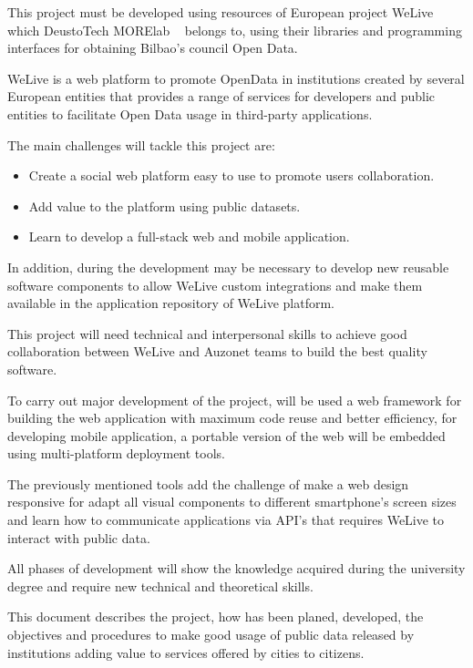 \documentclass{DeustoFDP}
\begin{document}
This project must be developed using resources of European project WeLive ~\cite{WeLive} which DeustoTech \cite{DeustoTech} MORElab ~\cite{Morelab} belongs to, using their libraries and programming interfaces for obtaining Bilbao's council Open Data. 

WeLive is a web platform to promote OpenData in institutions created by several European entities \cite{WeLiveConsortium} that provides a range of services for developers and public entities to facilitate Open Data usage in third-party applications.

The main challenges will tackle this project are:

\begin{itemize}
    \item Create a social web platform easy to use to promote users collaboration.
    \item Add value to the platform using public datasets.
    \item Learn to develop a full-stack web and mobile application.
\end{itemize}

In addition, during the development may be necessary to develop new reusable software components to allow WeLive custom integrations and make them available in the application repository of WeLive platform.

This project will need technical and interpersonal skills to achieve good collaboration between WeLive and Auzonet teams to build the best quality software.

To carry out major development of the project, will be used a web framework for building the web application with maximum code reuse and better efficiency, for developing mobile application, a portable version of the web will be embedded using multi-platform deployment tools.

The previously mentioned tools add the challenge of make a web design responsive for adapt all visual components to different smartphone's screen sizes  and learn how to communicate applications via API's that requires WeLive to interact with public data.

All phases of development will show the knowledge acquired during the university degree and require new technical and theoretical skills.

This document describes the project, how has been planed, developed, the objectives and procedures to make good usage of public data released by institutions adding value to services offered by cities to citizens.
\end{document}
